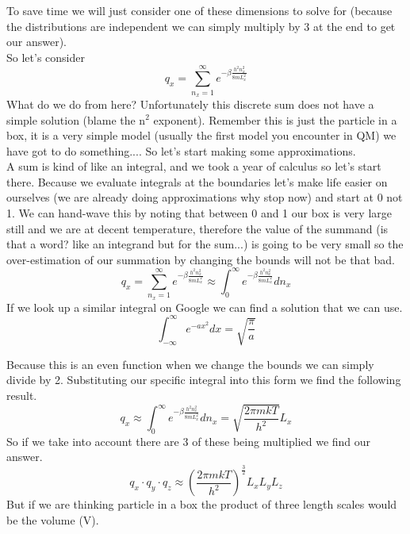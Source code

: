 \documentclass{article}
\begin{document}
To save time we will just consider one of these dimensions to solve for (because the distributions are independent we can simply multiply by 3 at the end to get our answer). \\
So let's consider 
\begin{equation}
    q_x =  \sum_{n_x=1}^\infty e^{-\beta \frac{h^2 n_x^2}{8mL_x^2}} 
\end{equation}
 What do we do from here?
 Unfortunately this discrete sum does not have a simple solution (blame the n$^2$ exponent).
 Remember this is just the particle in a box, it is a very simple model (usually the first model you encounter in QM) we have got to do something....
 So let's start making some approximations. \\
 A sum is kind of like an integral, and we took a year of calculus so let's start there. 
 Because we evaluate integrals at the boundaries let's make life easier on ourselves (we are already doing approximations why stop now) and start at 0 not 1. 
 We can hand-wave this by noting that between 0 and 1 our box is very large still and we are at decent temperature, therefore the value of the summand (is that a word? like an integrand but for the sum...) is going to be very small so the over-estimation of our summation by changing the bounds will not be that bad. 
 \begin{equation}
     q_x = \sum_{n_x=1}^\infty e^{-\beta \frac{h^2 n_x^2}{8mL_x^2}}  \approx \int_0^\infty e^{-\beta \frac{h^2 n_x^2}{8mL_x^2}} dn_x
 \end{equation}
 If we look up a similar integral on Google we can find a solution that we can use.
 \begin{equation}
     \int_{-\infty}^\infty e^{-ax^2}dx = \sqrt{\frac{\pi}{a}}
 \end{equation}

Because this is an even function when we change the bounds we can simply divide by 2. 
Substituting our specific integral into this form we find the following result. 
\begin{equation}
    q_x \approx \int_0^\infty e^{-\beta \frac{h^2 n_x^2}{8mL_x^2}} dn_x = \sqrt{\frac{2\pi mkT}{h^2}}L_x
\end{equation}
 So if we take into account there are 3 of these being multiplied we find our answer. 
 \begin{equation}
     q_x\cdot q_y \cdot q_z \approx \left (\frac{2\pi mkT}{h^2} \right )^{\frac{3}{2}} L_xL_yL_z
 \end{equation}
 But if we are thinking particle in a box the product of three length scales would be the volume (V). 
 
\end{document}
